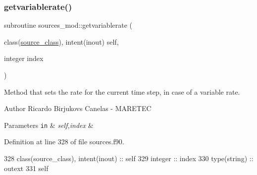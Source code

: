 \subsubsection{\texorpdfstring{getvariablerate()}{getvariablerate()}}
{\footnotesize\ttfamily subroutine sources\+\_\+mod\+::getvariablerate (\begin{DoxyParamCaption}\item[{class(\mbox{\hyperlink{structsources__mod_1_1source__class}{source\+\_\+class}}), intent(inout)}]{self,  }\item[{integer}]{index }\end{DoxyParamCaption})\hspace{0.3cm}{\ttfamily [private]}}



Method that sets the rate for the current time step, in case of a variable rate. 

\begin{DoxyAuthor}{Author}
Ricardo Birjukovs Canelas -\/ M\+A\+R\+E\+T\+EC 
\end{DoxyAuthor}

\begin{DoxyParams}[1]{Parameters}
\mbox{\tt in}  & {\em self,index} & \\
\hline
\end{DoxyParams}


Definition at line 328 of file sources.\+f90.


\begin{DoxyCode}
328     \textcolor{keywordtype}{class}(source\_class), \textcolor{keywordtype}{intent(inout)} :: self        
329     \textcolor{keywordtype}{integer} :: index
330     \textcolor{keywordtype}{type}(string) :: outext
331     self%
\end{DoxyCode}
\mbox{\label{namespacesources__mod_aef3551e97236f03fc73fcf77276bb318}} 
